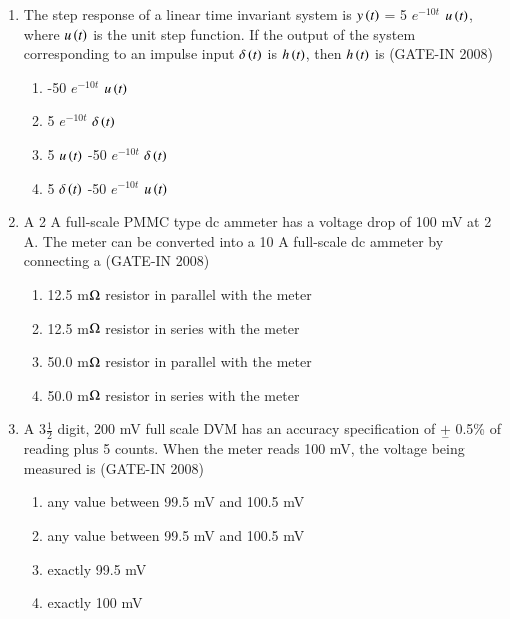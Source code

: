 \documentclass[journal,12pt,onecolumn]{IEEEtran}
\theoremstyle{remark}
\begin{document}
\begin{enumerate}
\item The step response of a linear time invariant system is $y\left(t\right)$ = 5 $e^{-10t}$ $u\left(t\right)$, where $u\left(t\right)$  is the unit step
function. If the output of the system corresponding to an impulse input $\delta\left(t\right)$ is $h\left(t\right)$, then $h\left(t\right)$ is \hfill{(GATE-IN 2008)}
\begin{multicols}{2}
          \begin{enumerate} 
                \item -50 $e^{-10t}$ $u\left(t\right)$
                \item 5 $e^{-10t}$ $\delta\left(t\right)$
                \item 5 $u\left(t\right)$ -50 $e^{-10t}$ $\delta\left(t\right)$
                \item 5 $\delta\left(t\right)$ -50 $e^{-10t}$ $u\left(t\right)$
                
           \end{enumerate}
           \end{multicols}

\item A 2 A full-scale PMMC type dc ammeter has a voltage drop of 100 mV at 2 A. The meter can be
converted into a 10 A full-scale dc ammeter by connecting a \hfill{(GATE-IN 2008)}
\begin{multicols}{2}
           \begin{enumerate} 
              \item  12.5 m$\ohm$ resistor in parallel with the meter 
              \item  12.5 m$\ohm$ resistor in series with the meter 
              \item  50.0 m$\ohm$ resistor in parallel with the meter 
              \item  50.0 m$\ohm$ resistor in series with the meter 
           \end{enumerate}
           \end{multicols}

\item  A 3$\frac{1}{2}$ digit, 200 mV full scale DVM has an accuracy specification of $\underset{-}{+}$ 0.5\%  of reading plus 5
counts. When the meter reads 100 mV, the voltage being measured is \hfill{(GATE-IN 2008)}
\begin{multicols}{2}
           \begin{enumerate} 
              \item any value between 99.5 mV and 100.5 mV 
              \item any value between 99.5 mV and 100.5 mV
              \item exactly 99.5 mV
              \item exactly 100 mV
           \end{enumerate}
           \end{multicols}


\end{enumerate}
\end{document}
